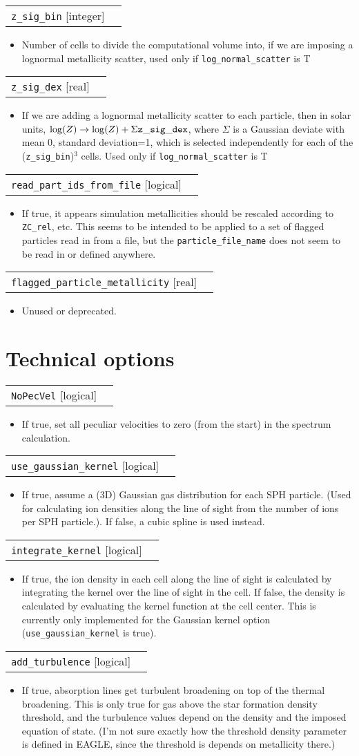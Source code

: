 \documentclass{report}
\makeatletter
\newcommand{\paramdefinition}[3]{
\begin{tabular*}{\textwidth}{l@{\extracolsep{\fill}}r}
		{\tt #1} [{\sc #2}]& #3 \\
\end{tabular*}}
\newcommand{\paramdescription}[1]{
\begin{itemize}
\item #1
\end{itemize}\vspace{0.2cm}}
\newcommand{\param}[1]{{\tt #1}}
\makeatother
\begin{document}
\paramdefinition{z\_sig\_bin}{integer}{}
\paramdescription{Number of cells to divide the computational volume into, if we are imposing a lognormal metallicity scatter, used only if {\tt log\_normal\_scatter} is T}

\paramdefinition{z\_sig\_dex}{real}{}
\paramdescription{If we are adding a lognormal metallicity scatter to each particle, then in solar units, $\log(Z) \rightarrow \log(Z)+\Sigma {\tt z\_sig\_dex}$, where $\Sigma$ is a Gaussian deviate with mean 0, standard deviation=1, which is selected independently for each of the ({\tt z\_sig\_bin})$^3$ cells. Used only if {\tt log\_normal\_scatter} is T}

\paramdefinition{read\_part\_ids\_from\_file}{logical}{}
\paramdescription{If true, it appears simulation metallicities should be rescaled according to \param{ZC\_rel}, etc. This seems to be intended to be applied to a set of flagged particles read in from a file, but the \param{particle\_file\_name} does not seem to be read in or defined anywhere.}

\paramdefinition{flagged\_particle\_metallicity}{real}{}
\paramdescription{Unused or deprecated.}



\section{Technical options}

\paramdefinition{NoPecVel}{logical}{}
\paramdescription{If true, set all peculiar velocities to zero (from the start) in the spectrum calculation.}

\paramdefinition{use\_gaussian\_kernel}{logical}{}
\paramdescription{If true, assume a (3D) Gaussian gas distribution for each SPH particle. (Used for calculating ion densities along the line of sight from the number of ions per SPH particle.). If false, a cubic spline is used instead.}

\paramdefinition{integrate\_kernel}{logical}{}
\paramdescription{If true, the ion density in each cell along the line of sight is calculated by integrating the kernel over the line of sight in the cell. If false, the density is calculated by evaluating the kernel function at the cell center. This is currently only implemented for the Gaussian kernel option (\param{use\_gaussian\_kernel} is true).}

\paramdefinition{add\_turbulence}{logical}{}
\paramdescription{If true, absorption lines get turbulent broadening on top of the thermal broadening. This is only true for gas above the star formation density threshold, and the turbulence values depend on the density and the imposed equation of state. (I'm not sure exactly how the threshold density parameter is defined in EAGLE, since the threshold is depends on metallicity there.)}
\end{document}
